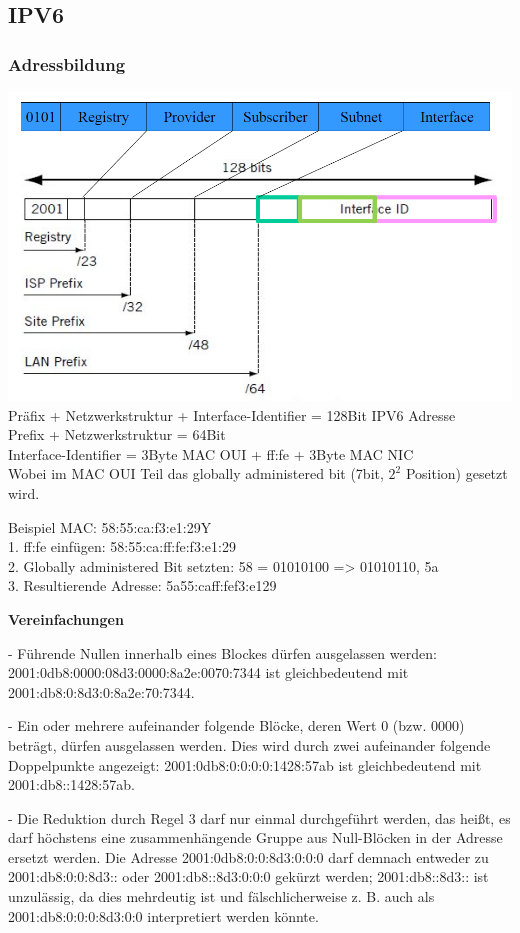 \subsection{IPV6}
\subsubsection{Adressbildung}
\includegraphics[scale=0.5]{media/ipv6.png}
Präfix + Netzwerkstruktur + Interface-Identifier = 128Bit IPV6 Adresse\\
Prefix + Netzwerkstruktur = 64Bit\\
Interface-Identifier = 3Byte MAC OUI + ff:fe + 3Byte MAC NIC\\
Wobei im MAC OUI Teil das globally administered bit (7bit, $2^{2}$ Position) gesetzt wird.

Beispiel MAC: 58:55:ca:f3:e1:29Y\\
1. ff:fe einfügen: 58:55:ca:ff:fe:f3:e1:29\\
2. Globally administered Bit setzten: 58 = 01010100 => 01010110, 5a\\
3. Resultierende Adresse: 5a55:caff:fef3:e129

\textbf{Vereinfachungen}

- Führende Nullen innerhalb eines Blockes dürfen ausgelassen werden: 2001:0db8:0000:08d3:0000:8a2e:0070:7344 ist gleichbedeutend mit 2001:db8:0:8d3:0:8a2e:70:7344.

- Ein oder mehrere aufeinander folgende Blöcke, deren Wert 0 (bzw. 0000) beträgt, dürfen ausgelassen werden. Dies wird durch zwei aufeinander folgende Doppelpunkte angezeigt: 2001:0db8:0:0:0:0:1428:57ab ist gleichbedeutend mit 2001:db8::1428:57ab.

- Die Reduktion durch Regel 3 darf nur einmal durchgeführt werden, das heißt, es darf höchstens eine zusammenhängende Gruppe aus Null-Blöcken in der Adresse ersetzt werden. Die Adresse 2001:0db8:0:0:8d3:0:0:0 darf demnach entweder zu 2001:db8:0:0:8d3:: oder 2001:db8::8d3:0:0:0 gekürzt werden; 2001:db8::8d3:: ist unzulässig, da dies mehrdeutig ist und fälschlicherweise z. B. auch als 2001:db8:0:0:0:8d3:0:0 interpretiert werden könnte.

